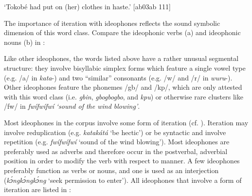 \glt ‘Tokobé had put on (her) clothes in haste.’ [ab03ab 111]
\z

The importance of iteration with ideophones reflects the sound symbolic dimension of this word class. Compare the ideophonic verbs (a) and ideophonic nouns (b) in :

Like other ideophones, the words listed above have a rather unusual segmental structure: they involve bisyllabic simplex forms which feature a single vowel type (e.g. /a/ in \textit{kata}{}-) and two “similar” consonants (e.g. /w/ and /r/ in \textit{wuru}{}-). Other ideophones feature the phonemes /gb/ and /kp/, which are only attested with this word class (i.e. \textit{gbin}, \textit{gbogbogbo}, and \textit{kpu}) or otherwise rare clusters like /fw/ in \textit{fwífwífwí}\textit{ \textup{‘sound of the wind blowing’}}. 


Most ideophones in the corpus involve some form of iteration (cf. ). Iteration may involve reduplication (e.g. \textit{katakátá} ‘be hectic’) or be syntactic and involve repetition (e.g. \textit{fwífwífwí} ‘sound of the wind blowing’). Most ideophones are preferably used as adverbs and therefore occur in the postverbal, adverbial position in order to modify the verb with respect to manner. A few ideophones preferably function as verbs or nouns, and one is used as an interjection (\textit{kɔ́ngkɔ́ngkɔ́ng} ‘seek permission to enter’). All ideophones that involve a form of iteration are listed in :



